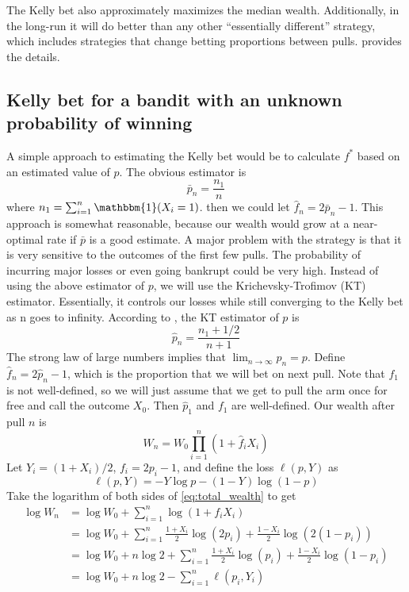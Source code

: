 \documentclass[letterpaper]{article}
\numberwithin{equation}{section}
\theoremstyle{plain}
\begin{document}
The Kelly bet also approximately maximizes the median wealth. Additionally, in the long-run it will do better than any other ``essentially different'' strategy, which includes strategies that change betting proportions between pulls. \cite{ethier2010doctrine} provides the details.

\subsection{Kelly bet for a bandit with an unknown probability of winning}\label{kelly_unknown_prob}
A simple approach to estimating the Kelly bet would be to calculate $f^*$ based on an estimated value of $p$. The obvious estimator is
\begin{equation*}
\bar{p}_n = \frac{n_1}{n}
\end{equation*}
where $n_1 = \sum_{i=1}^n \mathbbm{1}(X_i=1)$. then we could let $\hat{f}_n = 2\bar{p}_n - 1$. This approach is somewhat reasonable, because our wealth would grow at a near-optimal rate if $\bar{p}$ is a good estimate. A major problem with the strategy is that it is very sensitive to the outcomes of the first few pulls. The probability of incurring major losses or even going bankrupt could be very high. Instead of using the above estimator of $p$, we will use the Krichevsky-Trofimov (KT) estimator. Essentially, it controls our losses while still converging to the Kelly bet as n goes to infinity. According to \cite{cesa2006prediction}, the KT estimator of $p$ is
\begin{equation}
\hat{p}_n = \frac{n_1+1/2}{n+1}
\end{equation}
The strong law of large numbers implies that $\lim_{n\to\infty} \hat{p}_n = p$. Define $\hat{f}_n = 2\hat{p}_n - 1$, which is the proportion that we will bet on next pull. Note that $f_1$ is not well-defined, so we will just assume that we get to pull the arm once for free and call the outcome $X_0$. Then $\hat{p}_1$ and $f_1$ are well-defined. Our wealth after pull $n$ is
\begin{equation}\label{eq:total_wealth}
W_n = W_0\prod_{i=1}^n (1+\hat{f}_i X_i)
\end{equation}
Let $Y_i = (1+X_i)/2$, $f_i = 2p_i-1$, and define the loss $\ell(p,Y)$ as
\begin{equation}\label{ell_loss}
\ell(p,Y) = -Y\log p - (1-Y)\log(1-p)
\end{equation}
Take the logarithm of both sides of \ref{eq:total_wealth} to get
\begin{align}
\log W_n &= \log W_0 + \sum_{i=1}^n \log(1+f_i X_i)\\
&= \log W_0 + \sum_{i=1}^n \frac{1+X_i}{2} \log(2 p_i) + \frac{1-X_i}{2}\log(2(1-p_i))\\
&= \log W_0 + n\log 2 + \sum_{i=1}^n \frac{1+X_i}{2}\log(p_i) + \frac{1-X_i}{2}\log(1-p_i)\\
&= \log W_0 + n\log 2 - \sum_{i=1}^n \ell(p_i,Y_i)
\end{align}
\end{document}
